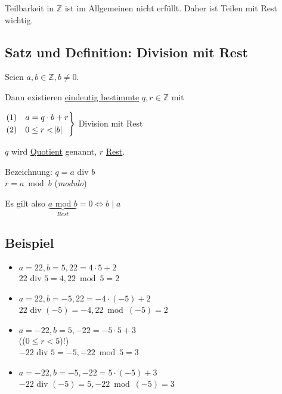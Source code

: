 \documentclass[a4paper, 12pt, twoside] {article}
\newcommand{\attention}{{\fontencoding{U}\fontfamily{futs}\selectfont\char 66\relax}\space}
\begin{document}
Teilbarkeit in $\mathbb{Z}$ ist im Allgemeinen nicht erfüllt. Daher ist Teilen mit Rest wichtig.

\subsection{Satz und Definition: Division mit Rest} %

Seien $a,b \in \mathbb{Z}, b \neq 0$.

Dann existieren \uline{eindeutig bestimmte} $q,r \in \mathbb{Z}$ mit

$\begin{rcases}
(1) & a = q \cdot b + r \\
(2) & 0 \leq r < \abs{b}
\end{rcases}$ Division mit Rest


$q$ wird \underline{Quotient} genannt, $r$ \underline{Rest}.

Bezeichnung: $q = a$ div $b$ \\
$r = a \bmod b$ (\textit{modulo})

Es gilt also $\underbrace{a \text{ mod } b}_{Rest} = 0 \Leftrightarrow b \mid a$

\subsection{Beispiel} %

\begin{itemize}

\item $a = 22, b = 5, 22 = 4 \cdot 5 +2$ \\
$22$ div $5 = 4, 22 \bmod 5 = 2$

\item $a = 22, b = -5, 22 = -4 \cdot (-5) + 2$ \\
$22$ div $(-5) = -4, 22 \bmod (-5) = 2$

\item $a = -22, b = 5, -22 = -5 \cdot 5+3$ \\
(\attention ($0 \leq r < 5$)!) \\
$-22$ div $5 = -5, -22 \bmod 5 = 3$

\item $a = -22, b = -5, -22 = 5 \cdot (-5) + 3$ \\
$-22$ div $(-5) = 5, -22 \bmod (-5) = 3$

\end{itemize}
\end{document}
